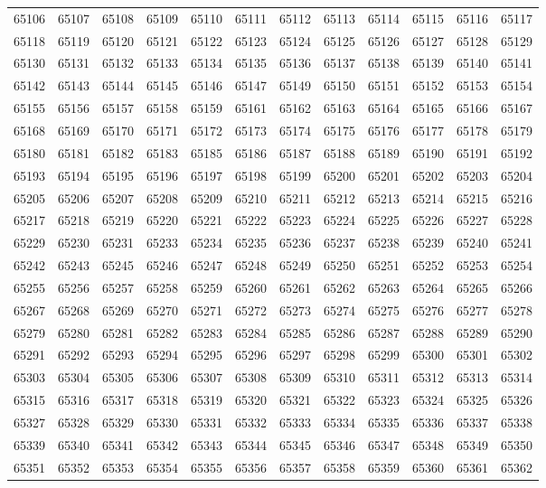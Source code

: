 \begin{center}
\begin{longtable}{llllllllllll}
65106 &65107 &65108 &65109 &65110 &65111 &65112 &65113 &65114 &65115 &65116 &65117 \\
65118 &65119 &65120 &65121 &65122 &65123 &65124 &65125 &65126 &65127 &65128 &65129 \\
65130 &65131 &65132 &65133 &65134 &65135 &65136 &65137 &65138 &65139 &65140 &65141 \\
65142 &65143 &65144 &65145 &65146 &65147 &65149 &65150 &65151 &65152 &65153 &65154 \\
65155 &65156 &65157 &65158 &65159 &65161 &65162 &65163 &65164 &65165 &65166 &65167 \\
65168 &65169 &65170 &65171 &65172 &65173 &65174 &65175 &65176 &65177 &65178 &65179 \\
65180 &65181 &65182 &65183 &65185 &65186 &65187 &65188 &65189 &65190 &65191 &65192 \\
65193 &65194 &65195 &65196 &65197 &65198 &65199 &65200 &65201 &65202 &65203 &65204 \\
65205 &65206 &65207 &65208 &65209 &65210 &65211 &65212 &65213 &65214 &65215 &65216 \\
65217 &65218 &65219 &65220 &65221 &65222 &65223 &65224 &65225 &65226 &65227 &65228 \\
65229 &65230 &65231 &65233 &65234 &65235 &65236 &65237 &65238 &65239 &65240 &65241 \\
65242 &65243 &65245 &65246 &65247 &65248 &65249 &65250 &65251 &65252 &65253 &65254 \\
65255 &65256 &65257 &65258 &65259 &65260 &65261 &65262 &65263 &65264 &65265 &65266 \\
65267 &65268 &65269 &65270 &65271 &65272 &65273 &65274 &65275 &65276 &65277 &65278 \\
65279 &65280 &65281 &65282 &65283 &65284 &65285 &65286 &65287 &65288 &65289 &65290 \\
65291 &65292 &65293 &65294 &65295 &65296 &65297 &65298 &65299 &65300 &65301 &65302 \\
65303 &65304 &65305 &65306 &65307 &65308 &65309 &65310 &65311 &65312 &65313 &65314 \\
65315 &65316 &65317 &65318 &65319 &65320 &65321 &65322 &65323 &65324 &65325 &65326 \\
65327 &65328 &65329 &65330 &65331 &65332 &65333 &65334 &65335 &65336 &65337 &65338 \\
65339 &65340 &65341 &65342 &65343 &65344 &65345 &65346 &65347 &65348 &65349 &65350 \\
65351 &65352 &65353 &65354 &65355 &65356 &65357 &65358 &65359 &65360 &65361 &65362 \\

\end{longtable}
\end{center}
